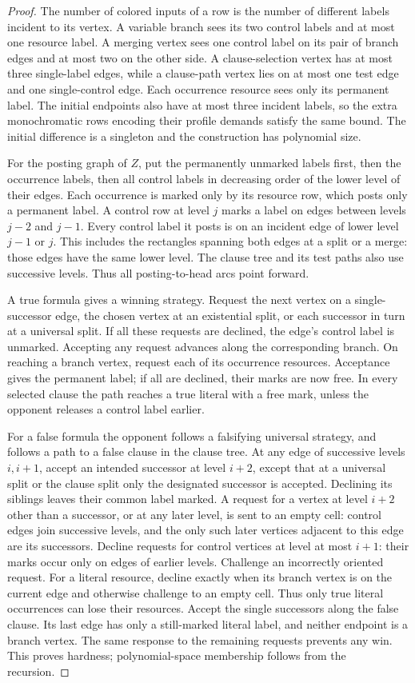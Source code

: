 \begin{proof}
The number of colored inputs of a row is the number of different
labels incident to its vertex. A variable branch sees its two control
labels and at most one resource label. A merging vertex sees one
control label on its pair of branch edges and at most two on the
other side. A clause-selection vertex has at most three single-label
edges, while a clause-path vertex lies on at most one test edge and
one single-control edge. Each occurrence resource sees only its
permanent label. The initial endpoints also have at most three
incident labels, so the extra monochromatic rows encoding their
profile demands satisfy the same bound. The initial difference is a
singleton and the construction has polynomial size.

For the posting graph of $Z$, put the permanently unmarked labels
first, then the occurrence labels, then all control labels in
decreasing order of the lower level of their edges. Each occurrence
is marked only by its resource row, which posts only a permanent
label. A control row at level $j$ marks a label on edges between
levels $j-2$ and $j-1$. Every control label it posts is on an
incident edge of lower level $j-1$ or $j$. This includes the
rectangles spanning both edges at a split or a merge: those edges
have the same lower level. The clause tree and its test paths also
use successive levels. Thus all posting-to-head arcs point forward.

A true formula gives a winning strategy. Request the next vertex on a
single-successor edge, the chosen vertex at an existential split, or each
successor in turn at a universal split. If all these requests are declined,
the edge's control label is unmarked. Accepting any request advances along
the corresponding branch. On reaching a branch vertex, request each of its occurrence resources.
Acceptance gives the permanent label; if all are declined, their marks
are now free. In every selected clause the path reaches a true literal
with a free mark, unless the opponent releases a control label earlier.

For a false formula the opponent follows a falsifying universal strategy,
and follows a path to a false clause in the clause tree. At any edge of successive
levels $i,i+1$, accept an intended successor at level $i+2$, except that at
a universal split or the clause split only the designated successor is
accepted. Declining its siblings leaves their common label marked. A request
for a vertex at level $i+2$ other than a successor, or at any later level,
is sent to an empty cell: control edges join successive levels, and the
only such later vertices adjacent to this edge are its successors. Decline
requests for control vertices at level at most $i+1$: their marks occur
only on edges of earlier levels. Challenge an incorrectly oriented request.
For a literal resource, decline exactly when its branch vertex is on the
current edge and otherwise challenge to an empty cell. Thus only true literal occurrences can lose their resources. Accept the
single successors along the false clause. Its last edge has only a
still-marked literal label, and neither endpoint is a branch vertex.
The same response to the remaining requests prevents any win. This proves hardness;
polynomial-space membership follows from the recursion.


\end{proof}
